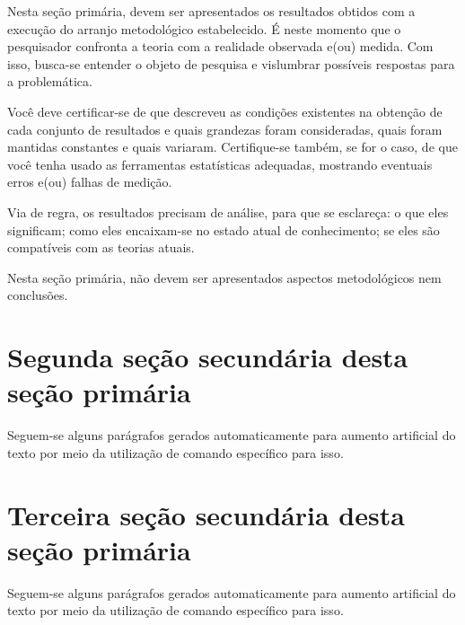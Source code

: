 Nesta seção primária, devem ser apresentados os resultados obtidos com a execução do arranjo metodológico estabelecido. É neste momento que o pesquisador confronta a teoria com a realidade observada e(ou) medida. Com isso, busca-se entender o objeto de pesquisa e vislumbrar possíveis respostas para a problemática.

Você deve certificar-se de que descreveu as condições existentes na obtenção de cada conjunto de resultados e quais grandezas foram consideradas, quais foram mantidas constantes e quais variaram. Certifique-se também, se for o caso, de que você tenha usado as ferramentas estatísticas adequadas, mostrando eventuais erros e(ou) falhas de medição. 

Via de regra, os resultados precisam de análise, para que se esclareça: o que eles significam; como eles encaixam-se no estado atual de conhecimento; se eles são compatíveis com as teorias atuais.

Nesta seção primária, não devem ser apresentados aspectos metodológicos nem conclusões.

\section{Segunda seção secundária desta seção primária}

Seguem-se alguns parágrafos gerados automaticamente para aumento artificial do texto por meio da utilização de comando específico para isso.

\lipsum[20-22]

\section{Terceira seção secundária desta seção primária}

Seguem-se alguns parágrafos gerados automaticamente para aumento artificial do texto por meio da utilização de comando específico para isso.

\lipsum[20-22]

